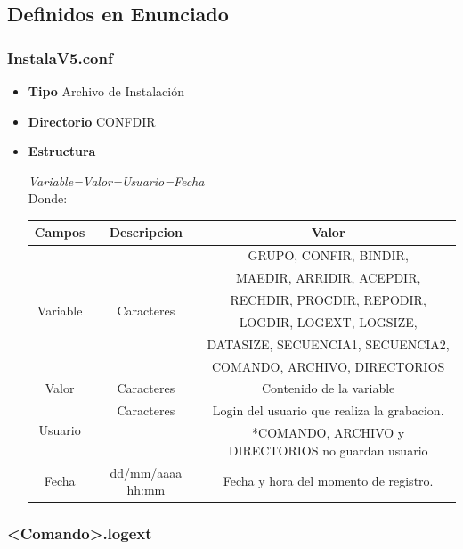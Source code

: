 \documentclass[a4paper,10pt,titlepage]{article}
\begin{document}
	\subsection{Definidos en Enunciado}
		
		\subsubsection{InstalaV5.conf}

			\begin {itemize}
				\item \textbf{Tipo} {Archivo de Instalaci\'on}
				\item \textbf{Directorio} {CONFDIR}
				\item \textbf{Estructura} {\textit{	Variable=Valor=Usuario=Fecha}\\
					Donde: \ 
					\begin{table}[H]
					\centering
					\begin{tabular}{| c | c | c |}
						\hline
						Campos 	& Descripcion & Valor \\
						\hline
						\multirow{6}{*}{Variable} & \multirow{6}{*}{Caracteres}	& GRUPO, CONFIR, BINDIR, \\
								{}			  & {}							 & MAEDIR, ARRIDIR, ACEPDIR, \\
								{}			& 	{}						& RECHDIR, PROCDIR, REPODIR, \\
								{}			& {}  							& LOGDIR, LOGEXT, LOGSIZE, \\
								{}			& 	{}						& DATASIZE, SECUENCIA1, SECUENCIA2, \\
								{}			& {} 							& COMANDO, ARCHIVO, DIRECTORIOS\\ 
						\hline 
						Valor 	& Caracteres 	& Contenido de la variable \\
						\hline
						\multirow{2}{*}{Usuario} & Caracteres & Login del usuario que realiza la grabacion. \\
											 &			&\small{ *COMANDO, ARCHIVO y DIRECTORIOS no guardan usuario}\\
						\hline
						Fecha	& dd/mm/aaaa hh:mm 	&	Fecha y hora del momento de registro. \\
						\hline
	
					\end{tabular}
					\end{table}
				}
			\end{itemize}
		
		\subsubsection{<Comando>.logext}
\end{document}
